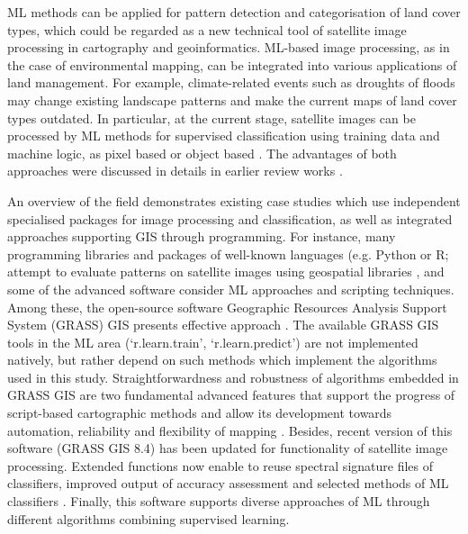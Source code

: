 \documentclass[12pt,a4paper,oneside]{article}
\def \newpar{\vspace{6pt}}
\begin{document}
\newpar ML methods can be applied for pattern detection and categorisation of land cover types, which could be regarded as a new technical tool of satellite image processing in cartography and geoinformatics. ML-based image processing, as in the case of environmental mapping, can be integrated into various applications of land management. For example, climate-related events such as droughts of floods may change existing landscape patterns and make the current maps of land cover types outdated. In particular, at the current stage, satellite images can be processed by ML methods for supervised classification using training data and machine logic, as pixel based \citep{RAHMAN2020100410,AYOADE2023337} or object based \citep{KARILA2023100046,Lemenkova202024,Lemenkova201528}. The advantages of both approaches were discussed in details in earlier review works \citep{NASIRI2023103555,ABUJAYYAB2023101802}. 

\newpar An overview of the field demonstrates existing case studies which use independent specialised packages for image processing and classification, as well as integrated approaches supporting GIS through programming. For instance, many programming libraries and packages of well-known languages (e.g. Python or R; \citep{Lemenkova202324} attempt to evaluate patterns on satellite images using geospatial libraries \citep{geomatics5010005,lemenkova2024approche}, and some of the advanced software consider ML approaches and scripting techniques. Among these, the open-source software Geographic Resources Analysis Support System (GRASS) GIS presents effective approach \citep{NETELER2012124,MitasovaNeteler}. The available GRASS GIS tools in the ML area (‘r.learn.train’, ‘r.learn.predict’) are not implemented natively, but rather depend on such methods which implement the algorithms used in this study. Straightforwardness and robustness of algorithms embedded in GRASS GIS are two fundamental advanced features that support the progress of script-based cartographic methods and allow its development towards automation, reliability and flexibility of mapping \citep{ROCCHINI201382,Lemenkova202307,ROCCHINI2017166}. Besides, recent version of this software (GRASS GIS 8.4) has been updated for functionality of satellite image processing. Extended functions now enable to reuse spectral signature files of classifiers, improved output of accuracy assessment and selected methods of ML classifiers \citep{Nartiss}. Finally, this software supports diverse approaches of ML through different algorithms combining supervised learning.
\end{document}
